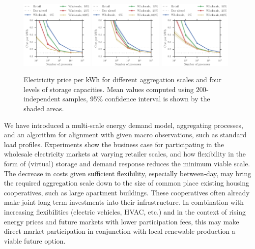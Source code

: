 \documentclass[conference]{IEEEtran}
\begin{document}
\begin{figure}[!t]
\centering
\includegraphics[width=0.32\textwidth]{figures/Wholesale_betweenDay.pdf}
\includegraphics[width=0.32\textwidth]{figures/Wholesale_flex.pdf}
\includegraphics[width=0.32\textwidth]{figures/Wholesale.pdf}
\caption{Electricity price per kWh for different aggregation scales and four levels of storage capacities. Mean values computed using $200$-independent samples, 95$\%$ confidence interval is shown by the shaded areas.}
\label{fig:Wholesale}
\end{figure}

We have introduced a multi-scale energy demand model, aggregating processes, and an algorithm for alignment with given macro observations, such as standard load profiles. Experiments show the business case for participating in the wholesale electricity markets at varying retailer scales, and how flexibility in the form of (virtual) storage and demand response reduces the minimum viable scale. The decrease in costs given sufficient flexibility, especially between-day, may bring the required aggregation scale down to the size of common place existing housing cooperatives, such as large apartment buildings. These cooperatives often already make joint long-term investments into their infrastructure. In combination with increasing flexibilities (electric vehicles, HVAC, etc.) and in the context of rising energy prices and future markets with lower participation fees, this may make direct market participation in conjunction with local renewable production a viable future option.
\end{document}
